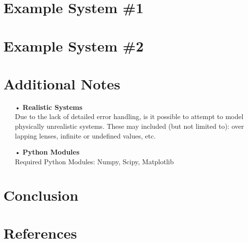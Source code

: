 \documentclass[12pt,letterpaper]{article}
\begin{document}

\section{Example System \#1}


\section{Example System \#2}


\section{Additional Notes}
\begin{itemize}
\item[•]\textbf{Realistic Systems}\\
Due to the lack of detailed error handling, is it possible to attempt to model physically unrealistic systems. These may included (but not limited to): over lapping lenses, infinite or undefined values, etc.
\item[•]\textbf{Python Modules}\\
Required Python Modules: Numpy, Scipy, Matplotlib

\end{itemize}


\section{Conclusion}


\section{References}

\end{document}
